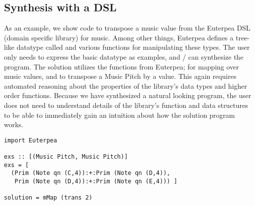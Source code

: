 \subsection{Synthesis with a DSL}

As an example, we show code to transpose a music value from the Euterpea DSL (domain specific library) for music\cite{euterpea}.
Among other things, Euterpea defines a tree-like datatype called  and various functions for manipulating these types.
The user only needs to express the basic datatype as examples, and \ourTool/ can synthesize the  program.
The solution utilizes the functions from Euterpea;  for mapping over music values, and  to transpose a Music Pitch by a value.
This again requires automated reasoning about the properties of the library's data types and higher order functions.
Because we have synthesized a natural looking program, the user does not need to understand details of the library's function and data structures to be able to immediately gain an intuition about how the solution program works.

\begin{lstlisting}
import Euterpea

exs :: [(Music Pitch, Music Pitch)]
exs = [
  (Prim (Note qn (C,4)):+:Prim (Note qn (D,4)),
   Prim (Note qn (D,4)):+:Prim (Note qn (E,4))) ]
        
solution = mMap (trans 2)
\end{lstlisting}

